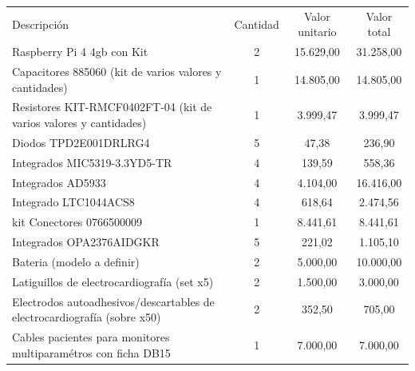 \documentclass[11pt]{charter}
\begin{document}
\begin{table}[htpb]
\centering
\begin{tabularx}{\linewidth}{@{}|X|c|r|r|@{}}
\hline
\rowcolor[HTML]{C0C0C0} 
\multicolumn{4}{|c|}{\cellcolor[HTML]{C0C0C0}COSTOS DIRECTOS} \\ \hline
\rowcolor[HTML]{C0C0C0} 
Descripción &
  \multicolumn{1}{c|}{\cellcolor[HTML]{C0C0C0}Cantidad} &
  \multicolumn{1}{c|}{\cellcolor[HTML]{C0C0C0}Valor unitario} &
  \multicolumn{1}{c|}{\cellcolor[HTML]{C0C0C0}Valor total} \\ \hline
 Raspberry Pi 4 4gb con Kit & 
  \multicolumn{1}{c|}{2} & 
  \multicolumn{1}{c|}{15.629,00} & 
  \multicolumn{1}{c|}{31.258,00} \\ \hline
Capacitores 885060 (kit de varios valores y cantidades) &
  \multicolumn{1}{c|}{1} & 
  \multicolumn{1}{c|}{14.805,00} & 
  \multicolumn{1}{c|}{14.805,00} \\ \hline
 Resistores KIT-RMCF0402FT-04 (kit de varios valores y cantidades) &
   \multicolumn{1}{c|}{1} & 
  \multicolumn{1}{c|}{3.999,47} & 
  \multicolumn{1}{c|}{3.999,47} \\ \hline
Diodos TPD2E001DRLRG4 &
   \multicolumn{1}{c|}{5} & 
  \multicolumn{1}{c|}{47,38} & 
  \multicolumn{1}{c|}{236,90} \\ \hline
Integrados MIC5319-3.3YD5-TR & 
  \multicolumn{1}{c|}{4} & 
  \multicolumn{1}{c|}{139,59} & 
  \multicolumn{1}{c|}{558,36} \\ \hline
Integrados AD5933 &
  \multicolumn{1}{c|}{4} & 
  \multicolumn{1}{c|}{4.104,00} & 
  \multicolumn{1}{c|}{16.416,00} \\ \hline
Integrado LTC1044ACS8 &
   \multicolumn{1}{c|}{4} & 
  \multicolumn{1}{c|}{618,64} & 
  \multicolumn{1}{c|}{2.474,56} \\ \hline
kit Conectores 0766500009 &
   \multicolumn{1}{c|}{1} & 
  \multicolumn{1}{c|}{8.441,61} & 
  \multicolumn{1}{c|}{8.441,61} \\ \hline
Integrados OPA2376AIDGKR &
   \multicolumn{1}{c|}{5} & 
  \multicolumn{1}{c|}{221,02} & 
  \multicolumn{1}{c|}{1.105,10} \\ \hline
Bateria  (modelo a definir) &
  \multicolumn{1}{c|}{2} & 
  \multicolumn{1}{c|}{5.000,00} & 
  \multicolumn{1}{c|}{10.000,00} \\ \hline
Latiguillos de electrocardiografía (set x5) &
  \multicolumn{1}{c|}{2} &
  \multicolumn{1}{c|}{1.500,00} &
  \multicolumn{1}{c|}{3.000,00} \\ \hline
Electrodos autoadhesivos/descartables de electrocardiografía (sobre x50) &
  \multicolumn{1}{c|}{2} &
  \multicolumn{1}{c|}{352,50} &
  \multicolumn{1}{c|}{705,00} \\ \hline
Cables pacientes para monitores multiparamétros con ficha DB15 &
  \multicolumn{1}{c|}{1} &
  \multicolumn{1}{c|}{7.000,00} &
  \multicolumn{1}{c|}{7.000,00} \\ \hline



\end{tabularx}
\end{table}
\end{document}
